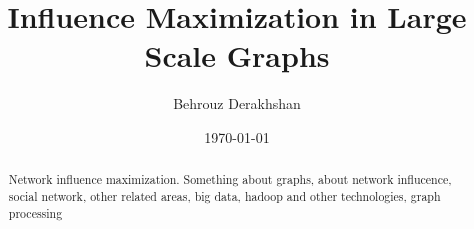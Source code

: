 \documentclass[english]{tktltiki}
\begin{document}
\onehalfspacing

\title{Influence Maximization in Large Scale Graphs}
\author{Behrouz Derakhshan}
\date{\today}

\maketitle



\begin{abstract}

Network influence maximization. Something about graphs, about network influcence, social network, other related areas, big data, hadoop and other technologies, graph processing

\end{abstract}

\mytableofcontents
\end{document}
